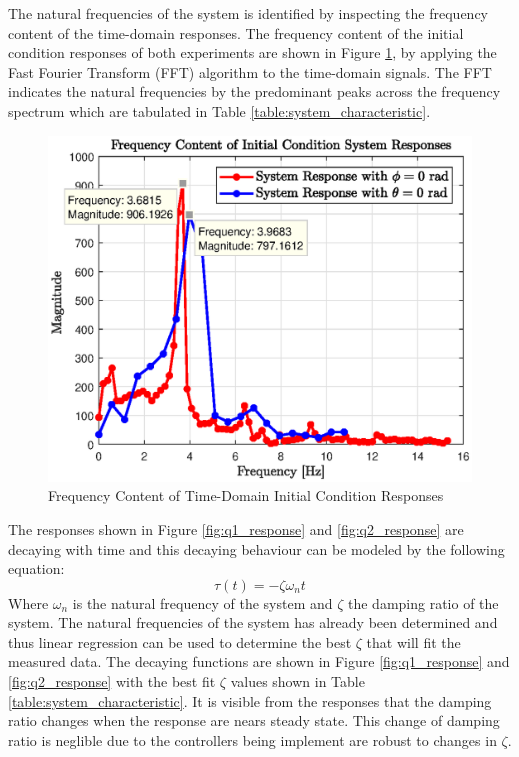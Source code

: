 The natural frequencies of the system is identified by inspecting the frequency content of the time-domain responses. The frequency content of the initial condition responses of both experiments are shown in Figure \ref{fig:fft_system_response}, by applying the Fast Fourier Transform (FFT) algorithm to the time-domain signals. The FFT indicates the natural frequencies by the predominant peaks across the frequency spectrum which are tabulated in Table \ref{table:system_characteristic}.\\

\begin{figure}[h]
	\centering
	\includegraphics[scale=1]{./figs/FFT_system.eps}
	\caption{Frequency Content of Time-Domain Initial Condition Responses}
	\label{fig:fft_system_response}
\end{figure}

The responses shown in Figure \ref{fig:q1_response} and \ref{fig:q2_response} are decaying with time and this decaying behaviour can be modeled by the following equation: $$\tau(t) = -\zeta \omega_{n} t$$ Where $\omega_{n}$ is the natural frequency of the system and $\zeta$ the damping ratio of the system. The natural frequencies of the system has already been determined and thus linear regression can be used to determine the best $\zeta$ that will fit the measured data. The decaying functions are shown in Figure \ref{fig:q1_response} and \ref{fig:q2_response} with the best fit $\zeta$ values shown in Table \ref{table:system_characteristic}. It is visible from the responses that the damping ratio changes when the response are nears steady state. This change of damping ratio is neglible due to the controllers being implement are robust to changes in $\zeta$.

